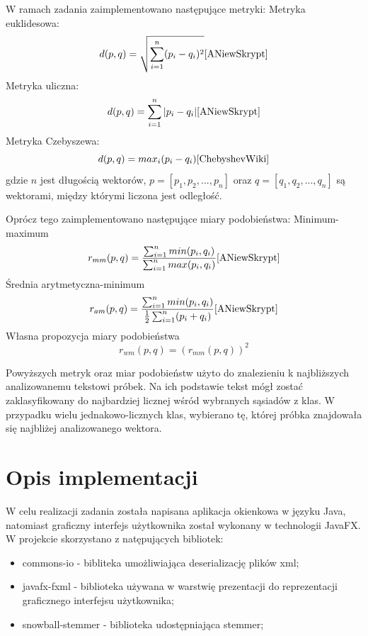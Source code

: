 \documentclass{classrep}
\begin{document}
W ramach zadania zaimplementowano następujące metryki: \newline
Metryka euklidesowa:
\begin{equation}
d(p,q) = \sqrt{\sum_{i=1}^{n} (p_{i} -q_{i})^{2}} \cite{ANiewSkrypt}
\end{equation}
Metryka uliczna:
\begin{equation}
d(p,q) = \sum_{i=1}^{n} |p_{i} -q_{i}| \cite{ANiewSkrypt}
\end{equation}
Metryka Czebyszewa:
\begin{equation}
d(p,q) = max_{i}(p_{i} -q_{i}) \cite{ChebyshevWiki}
\end{equation}
gdzie \(n\) jest długością wektorów, \(p = [p_{1}, p_{2}, ..., p_{n}]\) oraz \(q = [q_{1}, q_{2}, ..., q_{n}]\) są wektorami, między którymi liczona jest odległość. 

Oprócz tego zaimplementowano następujące miary podobieństwa: \newline
Minimum-maximum
\begin{equation}
r_{mm}(p,q) = \frac{\sum_{i=1}^{n}min(p_{i},q_{i})}{\sum_{i=1}^{n}max(p_{i},q_{i})} \cite{ANiewSkrypt}
\end{equation}
Średnia arytmetyczna-minimum
\begin{equation}
r_{am}(p,q) = \frac{\sum_{i=1}^{n}min(p_{i},q_{i})}{\frac{1}{2}\sum_{i=1}^{n}(p_{i}+q_{i})} \cite{ANiewSkrypt}
\end{equation}
Własna propozycja miary podobieństwa
\begin{equation}
r_{wm}(p,q) = (r_{mm}(p,q))^{2}
\end{equation}

Powyższych metryk oraz miar podobieństw użyto do znalezieniu k najbliższych analizowanemu tekstowi próbek. Na ich podstawie tekst mógł zostać zaklasyfikowany do najbardziej licznej wśród wybranych sąsiadów z klas. W przypadku wielu jednakowo-licznych klas, wybierano tę, której próbka znajdowała się najbliżej analizowanego wektora.

\section{Opis implementacji}

W celu realizacji zadania została napisana aplikacja okienkowa w języku Java, natomiast graficzny interfejs użytkownika został wykonany w technologii JavaFX.
W projekcie skorzystano z natępujących bibliotek:
\begin{itemize}
	\item commons-io - bibliteka umożliwiająca deserializację plików xml; \cite{commons-io}
	\item javafx-fxml - biblioteka używana w warstwię prezentacji do reprezentacji graficznego interfejsu użytkownika; \cite{JavaFX}
	\item snowball-stemmer - biblioteka udostępniająca stemmer; \cite{Stemmer}
\end{itemize}
\end{document}
